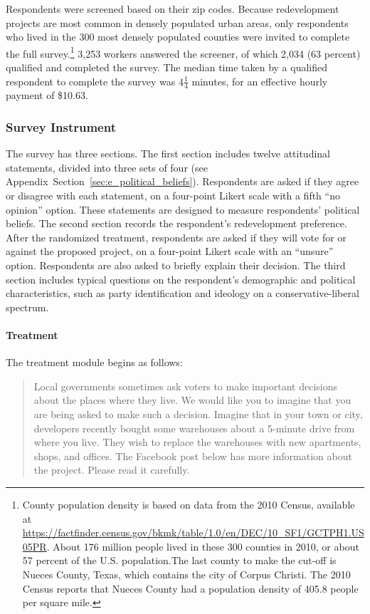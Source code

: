\documentclass[article,11pt]{memoir}
\begin{document}
Respondents were screened based on their zip codes.  Because redevelopment projects are most common in densely populated urban areas, only respondents who lived in the 300 most densely populated counties were invited to complete the full survey.\footnote{County population density is based on data from the 2010 Census, available at \url{https://factfinder.census.gov/bkmk/table/1.0/en/DEC/10_SF1/GCTPH1.US05PR}. About 176 million people lived in these 300 counties in 2010, or about 57 percent of the U.S. population.The last county to make the cut-off is Nueces County, Texas, which contains the city of Corpus Christi. The 2010 Census reports that Nueces County had a population density of 405.8 people per square mile.} 3,253 workers answered the screener, of which 2,034 (63 percent) qualified and completed the survey.  The median time taken by a qualified respondent to complete the survey was $4 \frac 14$ minutes, for an effective hourly payment of \$10.63.

\subsubsection{Survey Instrument}

The survey has three sections.  The first section includes twelve attitudinal statements, divided into three sets of four (see Appendix~Section~\ref{sec:e_political_beliefs}).  Respondents are asked if they agree or disagree with each statement, on a four-point Likert scale with a fifth ``no opinion'' option.  These statements are designed to measure respondents' political beliefs.  The second section records the respondent's redevelopment preference.  After the randomized treatment, respondents are asked if they will vote for or against the proposed project, on a four-point Likert scale with an ``unsure'' option.  Respondents are also asked to briefly explain their decision.  The third section includes typical questions on the respondent's demographic and political characteristics, such as party identification and ideology on a conservative-liberal spectrum.

\paragraph{Treatment} The treatment module begins as follows:

\begin{quote}
Local governments sometimes ask voters to make important decisions about the places where they live. We would like you to imagine that you are being asked to make such a decision.  Imagine that in your town or city, developers recently bought some warehouses about a 5-minute drive from where you live. They wish to replace the warehouses with new apartments, shops, and offices. The Facebook post below has more information about the project. Please read it carefully.
\end{quote}
\end{document}
